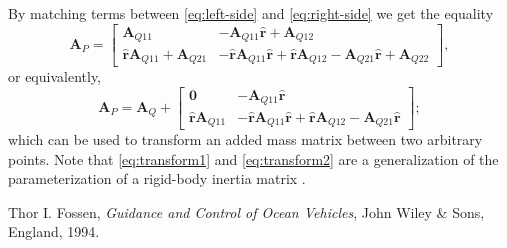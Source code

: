 \documentclass[onecolumn]{article}
\begin{document}
By matching terms between \eqref{eq:left-side} and \eqref{eq:right-side} we get the equality
\begin{equation}
    \bm{A}_P =
    \left[
    \begin{array}{cc}
        \bm{A}_{Q11} & -\bm{A}_{Q11} \hat{\bm{r}} + \bm{A}_{Q12} \\
        \hat{\bm{r}} \bm{A}_{Q11} + \bm{A}_{Q21} & -\hat{\bm{r}} \bm{A}_{Q11} \hat{\bm{r}} + \hat{\bm{r}} \bm{A}_{Q12} - \bm{A}_{Q21} \hat{\bm{r}} + \bm{A}_{Q22}
    \end{array}
    \right],
    \label{eq:transform1}
\end{equation}
or equivalently,
\begin{equation}
    \bm{A}_P = \bm{A}_Q +
    \left[
    \begin{array}{cc}
        \bm{0} & -\bm{A}_{Q11} \hat{\bm{r}} \\
        \hat{\bm{r}} \bm{A}_{Q11} & -\hat{\bm{r}} \bm{A}_{Q11} \hat{\bm{r}} + \hat{\bm{r}} \bm{A}_{Q12} - \bm{A}_{Q21} \hat{\bm{r}}
    \end{array}
    \right];
    \label{eq:transform2}
\end{equation}
which can be used to transform an added mass matrix between two arbitrary points.
Note that \eqref{eq:transform1} and \eqref{eq:transform2} are a generalization of the parameterization of a rigid-body inertia matrix \cite[eq.~(2.91)]{fossen1994}.



\begin{thebibliography}{9}
    Thor I. Fossen,
    \textit{Guidance and Control of Ocean Vehicles},
    John Wiley \& Sons, England,
    1994.
\end{thebibliography}
\end{document}
